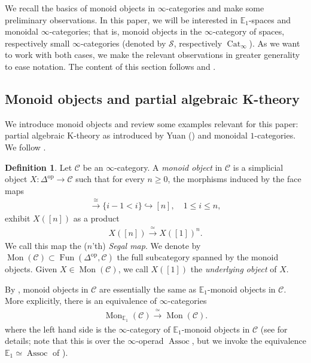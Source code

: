 \documentclass[12pt, reqno]{amsart}
\theoremstyle{plain}
\theoremstyle{definition}
\newtheorem{definition}[theorem]{Definition}
\begin{document}
We recall the basics of monoid objects in $\infty$-categories and make some preliminary observations. In this paper, we will be interested in $\mathbb{E}_1$-spaces and monoidal $\infty$-categories; that is, monoid objects in the $\infty$-category of spaces, respectively small $\infty$-categories (denoted by $\mathcal{S}$, respectively $\operatorname{Cat}_\infty$). As we want to work with both cases, we make the relevant observations in greater generality to ease notation. The content of this section follows \cite[\S 4.1.2]{LurieHA} and \cite[\S\S 4-5]{Yuan}.


\subsection{Monoid objects and partial algebraic K-theory}\label{E1-monoids}

We introduce monoid objects and review some examples relevant for this paper: partial algebraic K-theory as introduced by Yuan (\cite{Yuan}) and monoidal $1$-categories. We follow \cite[\S 4.1.2]{LurieHA}.


\begin{definition}
Let $\mathcal{C}$ be an $\infty$-category. A \textit{monoid object} in $\mathcal{C}$ is a simplicial object $X\colon \Delta^{\operatorname{op}}\rightarrow \mathcal{C}$ such that for every $n\geq 0$, the morphisms induced by the face maps 
\begin{align*}
[1]\xrightarrow{\cong} \{i-1<i\}\hookrightarrow [n],\quad 1\leq i\leq n,
\end{align*}
exhibit $X([n])$ as a product
\begin{align*}
X([n])\xrightarrow{\ \simeq\ } X([1])^n.
\end{align*}
We call this map the ($n$'th) \textit{Segal map}. We denote by $\operatorname{Mon}(\mathcal{C})\subset \operatorname{Fun}(\Delta^{\operatorname{op}},\mathcal{C})$ the full subcategory spanned by the monoid objects. Given $X\in \operatorname{Mon}(\mathcal{C})$, we call $X([1])$ the \textit{underlying object} of $X$.
\end{definition}

By \cite[Proposition 4.1.2.10]{LurieHA}, monoid objects in $\mathcal{C}$ are essentially the same as $\mathbb{E}_1$-monoid objects in $\mathcal{C}$. More explicitly, there is an equivalence of $\infty$-categories
\begin{align*}
\operatorname{Mon}_{\mathbb{E}_1}(\mathcal{C})\xrightarrow{\ \simeq\ }\operatorname{Mon}(\mathcal{C}).
\end{align*}
where the left hand side is the $\infty$-category of $\mathbb{E}_1$-monoid objects in $\mathcal{C}$ (see \cite[Definition 2.4.2.1]{LurieHA} for details; note that this is over the $\infty$-operad $\operatorname{Assoc}$, but we invoke the equivalence $\mathbb{E}_1\simeq \operatorname{Assoc}$ of \cite[Example 5.1.0.7]{LurieHA}).
\end{document}
